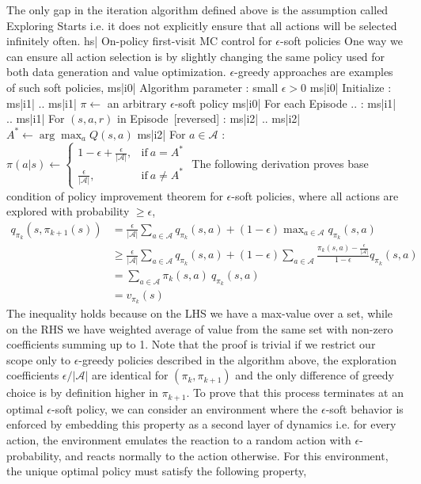 The only gap in the iteration algorithm defined above is the assumption called Exploring Starts i.e. it does not explicitly ensure that all actions will be selected infinitely often.
hs| On-policy first-visit MC control for \(\epsilon\)-soft policies
One way we can ensure all action selection is by slightly changing the same policy used for both data generation and value optimization. \(\epsilon\)-greedy approaches are examples of such soft policies,
ms|i0| Algorithm parameter : small \( \epsilon >0 \)
ms|i0| Initialize :
ms|i1| ..
ms|i1| \(\pi \leftarrow\) an arbitrary \(\epsilon\)-soft policy
ms|i0| For each Episode .. :
ms|i1| ..
ms|i1| For \( (s,a,r) \) in Episode [reversed] :
ms|i2| ..
ms|i2| \( A^* \leftarrow \arg\max_a Q(s, a) \)
ms|i2| For \(a \in \mathcal{A}\) : \( \pi(a | s) \leftarrow \begin{cases} 1 - \epsilon + \frac{\epsilon}{|\mathcal{A}|}, & \text{if} \ a = A^* \\ \frac{\epsilon}{|\mathcal{A}|}, & \text{if} \ a \neq A^* \end{cases} \)
The following derivation proves base condition of policy improvement theorem for \( \epsilon \)-soft policies, where all actions are explored with probability \(\ge \epsilon \),
\( \begin{aligned} q_{\pi_k}(s, \pi_{k+1}(s)) &= \frac{\epsilon}{|\mathcal{A}|} \sum_{a \in \mathcal{A}} q_{\pi_k}(s, a) + (1 - \epsilon) \max_{a \in \mathcal{A}} q_{\pi_k}(s,a) \\ &\ge \frac{\epsilon}{|\mathcal{A}|} \sum_{a \in \mathcal{A}} q_{\pi_k}(s, a) + (1 - \epsilon) \sum_{a \in \mathcal{A}} \frac{\pi_k(s, a) - \frac{\epsilon}{|\mathcal{A}|}}{1 - \epsilon} q_{\pi_k}(s, a) \\ &= \sum_{a \in \mathcal{A}} \pi_k(s, a) \ q_{\pi_k}(s, a) \\ &= v_{\pi_k}(s) \end{aligned} \)
The inequality holds because on the LHS we have a max-value over a set, while on the RHS we have weighted average of value from the same set with non-zero coefficients summing up to 1.
Note that the proof is trivial if we restrict our scope only to \( \epsilon \)-greedy policies described in the algorithm above, the exploration coefficients \( \epsilon/|\mathcal{A}| \) are identical for \( (\pi_k, \pi_{k+1}) \) and the only difference of greedy choice is by definition higher in \( \pi_{k+1} \).
To prove that this process terminates at an optimal \( \epsilon \)-soft policy, we can consider an environment where the \( \epsilon \)-soft behavior is enforced by embedding this property as a second layer of dynamics i.e. for every action, the environment emulates the reaction to a random action with \( \epsilon \)-probability, and reacts normally to the action otherwise. For this environment, the unique optimal policy must satisfy the following property,
